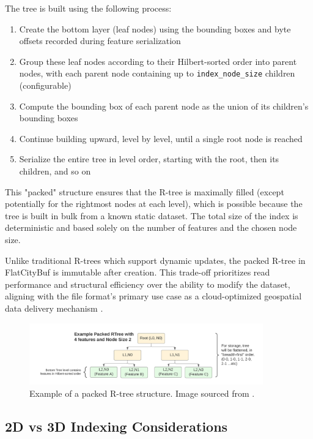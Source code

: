 The tree is built using the following process:

\begin{enumerate}
    \item Create the bottom layer (leaf nodes) using the bounding boxes and byte offsets recorded during feature serialization
    \item Group these leaf nodes according to their Hilbert-sorted order into parent nodes, with each parent node containing up to \texttt{index\_node\_size} children (configurable)
    \item Compute the bounding box of each parent node as the union of its children's bounding boxes
    \item Continue building upward, level by level, until a single root node is reached
    \item Serialize the entire tree in level order, starting with the root, then its children, and so on
\end{enumerate}

This "packed" structure ensures that the R-tree is maximally filled (except potentially for the rightmost nodes at each level), which is possible because the tree is built in bulk from a known static dataset. The total size of the index is deterministic and based solely on the number of features and the chosen node size.

Unlike traditional R-trees which support dynamic updates, the packed R-tree in FlatCityBuf is immutable after creation. This trade-off prioritizes read performance and structural efficiency over the ability to modify the dataset, aligning with the file format's primary use case as a cloud-optimized geospatial data delivery mechanism \citep{horance_2022_overview}.

\begin{figure}[ht]
    \centering
    \includegraphics[width=0.9\textwidth]{./figs/methodology/packed_rtree.png}
    \caption{Example of a packed R-tree structure. Image sourced from \cite{horance_2022_overview}.}
    \label{fig:packed_rtree}
\end{figure}

\subsection{2D vs 3D Indexing Considerations}
\label{methodology:spatial_index:2d_vs_3d_indexing}

